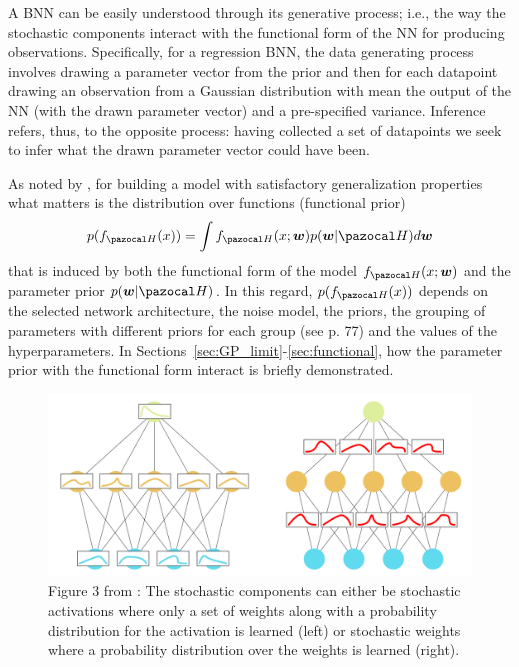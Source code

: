 A BNN can be easily understood through its generative process; i.e., the way the stochastic components interact with the functional form of the NN for producing observations. 
Specifically, for a regression BNN, the data generating process involves drawing a parameter vector from the prior and then for each datapoint drawing an observation from a Gaussian distribution with mean the output of the NN (with the drawn parameter vector) and a pre-specified variance.
Inference refers, thus, to the opposite process: having collected a set of datapoints we seek to infer what the drawn parameter vector could have been.

As noted by \textcite{wilson2020bayesian}, for building a model with satisfactory generalization properties what matters is the distribution over functions (functional prior) 
\begin{equation}\label{functional_prior}
	p(f_{\cH}(x)) = \int f_{\cH}(x;\bw) p(\bw|\cH) d\bw
\end{equation}
that is induced by both the functional form of the model $f_{\cH}(x;\bw)$ and the parameter prior $p(\bw|\cH)$.
In this regard, $p(f_{\cH}(x))$ depends on the selected network architecture, the noise model, the priors, the grouping of parameters with different priors for each group (see \cite{neal1995bayesian} p. 77) and the values of the hyperparameters.
In Sections~\ref{sec:GP_limit}-\ref{sec:functional}, how the parameter prior with the functional form interact is briefly demonstrated.

\begin{figure}
	\centering
	\includegraphics[width=0.9\linewidth]{./Figures/BNNs.png}
	\caption{Figure 3 from \textcite{jospin2020handson}: The stochastic components can either be stochastic activations  where only a set of weights along with a probability distribution for the activation is learned (left) or stochastic weights where a probability distribution over the weights is learned (right).}
	\label{fig:BNNs}
\end{figure} 

